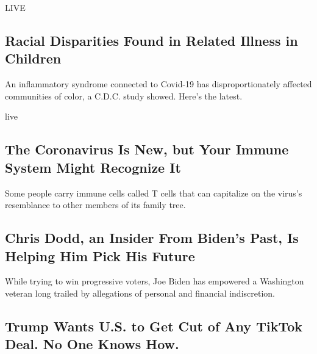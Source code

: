 \href{/2020/08/08/world/coronavirus-updates.html}{}

LIVE

\hypertarget{racial-disparities-found-in-related-illness-in-children}{%
\subsection{Racial Disparities Found in Related Illness in
Children}\label{racial-disparities-found-in-related-illness-in-children}}

An inflammatory syndrome connected to Covid-19 has disproportionately
affected communities of color, a C.D.C. study showed. Here's the latest.

live

\href{/2020/08/06/health/coronavirus-immune-cells.html}{}

\hypertarget{the-coronavirus-is-new-but-your-immune-system-might-recognize-it}{%
\subsection{The Coronavirus Is New, but Your Immune System Might
Recognize
It}\label{the-coronavirus-is-new-but-your-immune-system-might-recognize-it}}

Some people carry immune cells called T cells that can capitalize on the
virus's resemblance to other members of its family tree.

\href{/2020/08/08/us/politics/biden-vp-chris-dodd.html}{}

\hypertarget{chris-dodd-an-insider-from-bidens-past-is-helping-him-pick-his-future}{%
\subsection{Chris Dodd, an Insider From Biden's Past, Is Helping Him
Pick His
Future}\label{chris-dodd-an-insider-from-bidens-past-is-helping-him-pick-his-future}}

While trying to win progressive voters, Joe Biden has empowered a
Washington veteran long trailed by allegations of personal and financial
indiscretion.

\href{/2020/08/08/us/politics/trump-tiktok-deal-treasury.html}{}

\hypertarget{trump-wants-us-to-get-cut-of-any-tiktok-deal-no-one-knows-how}{%
\subsection{Trump Wants U.S. to Get Cut of Any TikTok Deal. No One Knows
How.}\label{trump-wants-us-to-get-cut-of-any-tiktok-deal-no-one-knows-how}}

